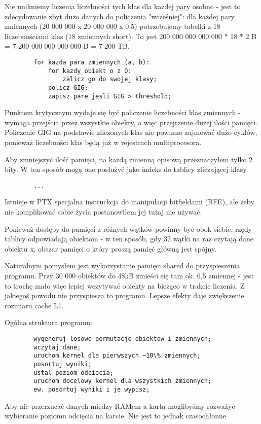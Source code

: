 \documentclass[a4paper]{article}
\begin{document}
    Nie unikniemy liczenia liczebności tych klas dla każdej pary osobno - jest to zdecydowanie zbyt dużo danych do policzenia "wcześniej": dla każdej pary zmiennych (20 000 000 x 20 000 000 x 0.5) potrzebujemy tabelki z 18 liczebnościami klas (18 zmiennych short). To jest 200 000 000 000 000 * 18 * 2 B = 7 200 000 000 000 000 B = 7 200 TB.

    \begin{lstlisting}
        for kazda para zmiennych (a, b):
            for kazdy obiekt o z O:
                zalicz go do swojej klasy;
            policz GIG;
            zapisz pare jesli GIG > threshold;
    \end{lstlisting}

    Punktem krytycznym wydaje się być policzenie liczebności klas zmiennych - wymaga przejścia przez wszystkie obiekty, a więc przejrzenie dużej ilości pamięci. Policzenie GIG na podstawie zliczonych klas nie powinno zajmować dużo cyklów, ponieważ liczebności klas będą już w rejestrach multiprocesora.

    Aby zmniejszyć ilość pamięci, na każdą zmienną opisową przeznaczyłem tylko 2 bity. W ten sposób mogą one posłużyć jako indeks do tablicy zliczającej klasy.

    \begin{lstlisting}
        ...
    \end{lstlisting}

    Istnieje w PTX specjalna instruckcja do manipulacji bitfieldami (BFE), ale żeby nie komplikować sobie życia postanowiłem jej tutaj nie używać.

    Ponieważ dostępy do pamięci z różnych wątków powinny być obok siebie, rzędy tablicy odpowiadają obiektom - w ten sposób, gdy 32 wątki na raz czytają dane obiektu x, obszar pamięci o który proszą pamięć główną jest spójny.

    Naturalnym pomysłem jest wykorzystanie pamięci shared do przyspieszenia programu. Przy 30 000 obiektów do 48kB zmieści się tam ok. 6,5 zmiennej - jest to trochę mało więc lepiej wczytywać obiekty na bieżąco w trakcie liczenia. Z jakiegoś powodu nie przyspiesza to programu. Lepsze efekty daje zwiększenie rozmiaru cache L1.


    Ogólna struktura programu:
    \begin{lstlisting}
        wygeneruj losowe permutacje obiektow i zmiennych;
        wczytaj dane;
        uruchom kernel dla pierwszych ~10\% zmiennych;
        posortuj wyniki;
        ustal poziom odciecia;
        uruchom docelowy kernel dla wszystkich zmiennych;
        ew. posortuj wyniki i je wypisz;
    \end{lstlisting} 
    Aby nie przerzucać danych między RAMem a kartą moglibyśmy rozważyć wybieranie poziomu odcięcia na karcie. Nie jest to jednak czasochłonne
\end{document}
